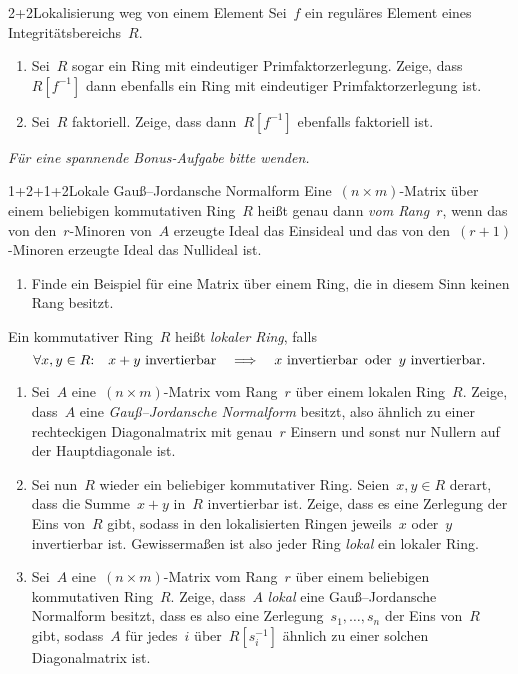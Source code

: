 \documentclass{algblatt}
\begin{document}
\begin{aufgabe}{2+2}{Lokalisierung weg von einem Element}
Sei~$f$ ein reguläres Element eines Integritätsbereichs~$R$.
\begin{enumerate}
\item Sei~$R$ sogar ein Ring mit eindeutiger Primfaktorzerlegung. Zeige,
dass~$R[f^{-1}]$ dann ebenfalls ein Ring mit eindeutiger Primfaktorzerlegung
ist.
\item Sei~$R$ faktoriell. Zeige, dass dann~$R[f^{-1}]$ ebenfalls faktoriell
ist.
\end{enumerate}
\end{aufgabe}

\begin{center}
\emph{Für eine spannende Bonus-Aufgabe bitte wenden.}
\end{center}
\newpage

\begin{aufgabe}{1+2+1+2}{Lokale Gauß--Jordansche Normalform}
Eine~$(n \times m)$-Matrix über einem beliebigen kommutativen Ring~$R$
heißt genau dann \emph{vom Rang~$r$}, wenn das von den~$r$-Minoren von~$A$
erzeugte Ideal das Einsideal und das von den~$(r+1)$-Minoren erzeugte Ideal das
Nullideal ist.
\begin{enumerate}
\item Finde ein Beispiel für eine Matrix über einem Ring, die in diesem Sinn
keinen Rang besitzt.
\end{enumerate}
Ein kommutativer Ring~$R$ heißt \emph{lokaler Ring}, falls
\[ \forall x,y \in R{:}\quad \text{$x + y$ invertierbar}
\quad\Longrightarrow\quad
\text{$x$ invertierbar \,oder\, $y$ invertierbar}. \]
\begin{enumerate}
\addtocounter{enumi}{1}
\item Sei~$A$ eine~$(n \times m)$-Matrix vom Rang~$r$ über einem lokalen Ring~$R$.
Zeige, dass~$A$ eine \emph{Gauß--Jordansche Normalform} besitzt,
also ähnlich zu einer rechteckigen Diagonalmatrix
mit genau~$r$ Einsern und sonst nur Nullern auf der Hauptdiagonale ist.
\item Sei nun~$R$ wieder ein beliebiger kommutativer Ring. Seien~$x,y \in R$ derart, dass die
Summe~$x+y$ in~$R$ invertierbar ist. Zeige, dass es eine Zerlegung der Eins
von~$R$ gibt, sodass in den lokalisierten Ringen jeweils~$x$ oder~$y$
invertierbar ist. Gewissermaßen ist also jeder Ring \emph{lokal} ein lokaler
Ring.
\item Sei~$A$ eine~$(n \times m)$-Matrix vom Rang~$r$ über einem beliebigen
kommutativen Ring~$R$. Zeige, dass~$A$ \emph{lokal} eine
Gauß--Jordansche Normalform besitzt, dass es also eine
Zerlegung~$s_1,\ldots,s_n$ der Eins von~$R$ gibt, sodass~$A$ für jedes~$i$
über~$R[s_i^{-1}]$ ähnlich zu einer solchen Diagonalmatrix ist.
\end{enumerate}
\end{aufgabe}
\end{document}
